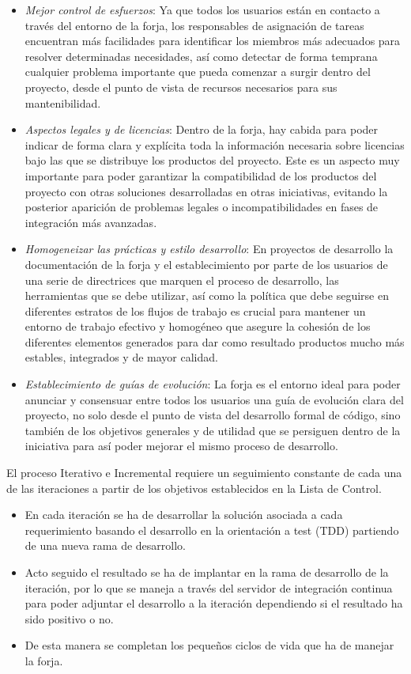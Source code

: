 \begin{itemize}
	\item \emph{Mejor control de esfuerzos}: Ya que todos los usuarios están en contacto a través del entorno de la forja, los responsables de asignación de tareas encuentran más facilidades para identificar los miembros más adecuados para resolver determinadas necesidades, así como detectar de forma temprana cualquier problema importante que pueda comenzar a surgir dentro del proyecto, desde el punto de vista de recursos necesarios para sus mantenibilidad.
    \item \emph{Aspectos legales y de licencias}: Dentro de la forja, hay cabida para poder indicar de forma clara y explícita toda la información necesaria sobre licencias bajo las que se distribuye los productos del proyecto. Este es un aspecto muy importante para poder garantizar la compatibilidad de los productos del proyecto con otras soluciones desarrolladas en otras iniciativas, evitando la posterior aparición de problemas legales o incompatibilidades en fases de integración más avanzadas.
    \item \emph{Homogeneizar las prácticas y estilo desarrollo}: En proyectos de desarrollo la documentación de la forja y el establecimiento por parte de los usuarios de una serie de directrices que marquen el proceso de desarrollo, las herramientas que se debe utilizar, así como la política que debe seguirse en diferentes estratos de los flujos de trabajo es crucial para mantener un entorno de trabajo efectivo y homogéneo que asegure la cohesión de los diferentes elementos generados para dar como resultado productos mucho más estables, integrados y de mayor calidad.
    \item \emph{Establecimiento de guías de evolución}: La forja es el entorno ideal para poder anunciar y consensuar entre todos los usuarios una guía de evolución clara del proyecto, no solo desde el punto de vista del desarrollo formal de código, sino también de los objetivos generales y de utilidad que se persiguen dentro de la iniciativa para así poder mejorar el mismo proceso de desarrollo.
\end{itemize}

\par El proceso Iterativo e Incremental requiere un seguimiento constante de cada una de las iteraciones a partir de los objetivos establecidos en la Lista de Control. 

\begin{itemize}
	\item En cada iteración se ha de desarrollar la solución asociada a cada requerimiento basando el desarrollo en la orientación a test (TDD) partiendo de una nueva rama de desarrollo.
	\item Acto seguido el resultado se ha de implantar en la rama de desarrollo de la iteración, por lo que se maneja a través del servidor de integración continua para poder adjuntar el desarrollo a la iteración dependiendo si el resultado ha sido positivo o no.
	\item De esta manera se completan los pequeños ciclos de vida que ha de manejar la forja.
\end{itemize}

